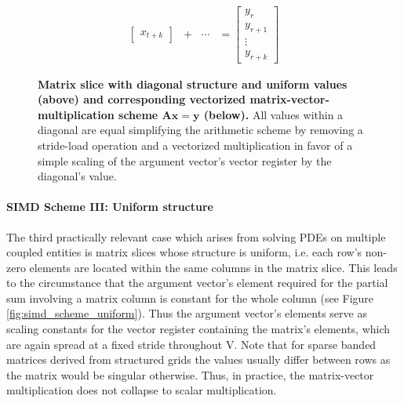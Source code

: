 \begin{figure}[ht]
$$\begin{matrix}
\begin{bmatrix}
                                                x_{t+k}
                                                                              \end{bmatrix} & + & \cdots & =  \begin{bmatrix}
                                                                                                                 y_{r} \\
                                                                                                                 y_{r+1} \\
                                                                                                                 \vdots \\
                                                                                                                 y_{r+k}
                                                                                                                \end{bmatrix}
        \end{matrix}
        $$
        \caption[Matrix slice with diagonal structure and uniform values and corresponding vectorized matrix-vector-multiplication scheme.]{\textbf{Matrix slice with diagonal structure and uniform values (above) and corresponding vectorized matrix-vector-multiplication scheme $\bm{Ax = y}$ (below).} All values within a diagonal are equal simplifying the arithmetic scheme by removing a stride-load operation and a vectorized multiplication in favor of a simple scaling of the argument vector's vector register by the diagonal's value.}
        \label{fig:simd_scheme_diag_collated}
      \end{figure}

      \paragraph{SIMD Scheme III: Uniform structure}

      The third practically relevant case which arises from solving PDEs on multiple coupled entities is matrix slices whose structure is uniform, i.e. each row's non-zero elements are located within the same columns in the matrix slice. This leads to the circumstance that the argument vector's element required for the partial sum involving a matrix column is constant for the whole column (see Figure \ref{fig:simd_scheme_uniform}). Thus the argument vector's elements serve as scaling constants for the vector register containing the matrix's elements, which are again spread at a fixed stride throughout V. Note that for sparse banded matrices derived from structured grids the values usually differ between rows as the matrix would be singular otherwise. Thus, in practice, the matrix-vector multiplication does not collapse to scalar multiplication.


